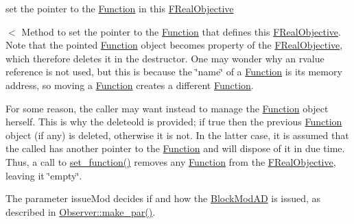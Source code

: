set the pointer to the \mbox{\hyperlink{class_s_m_spp__di__unipi__it_1_1_function}{Function}} in this \mbox{\hyperlink{class_s_m_spp__di__unipi__it_1_1_f_real_objective}{F\+Real\+Objective}} 

$<$ Method to set the pointer to the \mbox{\hyperlink{class_s_m_spp__di__unipi__it_1_1_function}{Function}} that defines this \mbox{\hyperlink{class_s_m_spp__di__unipi__it_1_1_f_real_objective}{F\+Real\+Objective}}. Note that the pointed \mbox{\hyperlink{class_s_m_spp__di__unipi__it_1_1_function}{Function}} object becomes property of the \mbox{\hyperlink{class_s_m_spp__di__unipi__it_1_1_f_real_objective}{F\+Real\+Objective}}, which therefore deletes it in the destructor. One may wonder why an rvalue reference is not used, but this is because the \char`\"{}name\char`\"{} of a \mbox{\hyperlink{class_s_m_spp__di__unipi__it_1_1_function}{Function}} is its memory address, so moving a \mbox{\hyperlink{class_s_m_spp__di__unipi__it_1_1_function}{Function}} creates a different \mbox{\hyperlink{class_s_m_spp__di__unipi__it_1_1_function}{Function}}.

For some reason, the caller may want instead to manage the \mbox{\hyperlink{class_s_m_spp__di__unipi__it_1_1_function}{Function}} object herself. This is why the deleteold is provided; if true then the previous \mbox{\hyperlink{class_s_m_spp__di__unipi__it_1_1_function}{Function}} object (if any) is deleted, otherwise it is not. In the latter case, it is assumed that the called has another pointer to the \mbox{\hyperlink{class_s_m_spp__di__unipi__it_1_1_function}{Function}} and will dispose of it in due time. Thus, a call to \mbox{\hyperlink{class_s_m_spp__di__unipi__it_1_1_f_real_objective_a91173cc091286d4bc102d8f54d564c1e}{set\+\_\+function()}} removes any \mbox{\hyperlink{class_s_m_spp__di__unipi__it_1_1_function}{Function}} from the \mbox{\hyperlink{class_s_m_spp__di__unipi__it_1_1_f_real_objective}{F\+Real\+Objective}}, leaving it \char`\"{}empty\char`\"{}.

The parameter issue\+Mod decides if and how the \mbox{\hyperlink{class_s_m_spp__di__unipi__it_1_1_block_mod_a_d}{Block\+Mod\+AD}} is issued, as described in \mbox{\hyperlink{class_s_m_spp__di__unipi__it_1_1_observer_a2d499ae38e5e95cf66cd71da32b0694a}{Observer\+::make\+\_\+par()}}. \mbox{\label{class_s_m_spp__di__unipi__it_1_1_f_real_objective_a216c7c4b025d1bc2e3b1a89dc2c1d46f}} 
